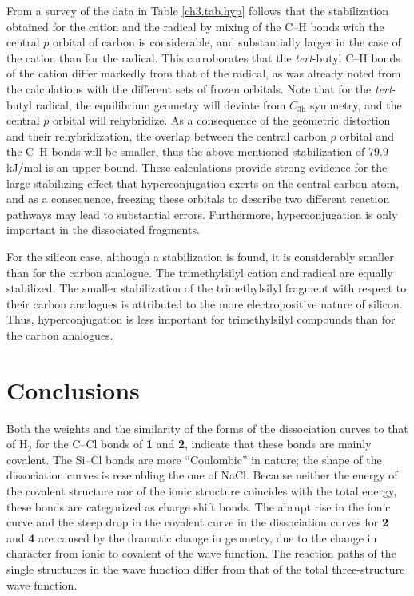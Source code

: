 From a survey of the data in Table \ref{ch3.tab.hyp} follows that the stabilization obtained for the cation and the radical by mixing of the C--H bonds with the central $p$ orbital of carbon is considerable, and substantially larger in the case of the cation than for the radical.  This  corroborates that the \textit{tert}-butyl C--H bonds of the cation differ markedly from that of the radical, as was already noted from the calculations with the different sets of frozen orbitals.  Note that for the \textit{tert}-butyl radical, the equilibrium geometry will deviate from $C_\mathrm{3h}$ symmetry, and the central $p$ orbital will rehybridize.  As a consequence of the geometric distortion and their rehybridization, the overlap between the central carbon $p$ orbital and the C--H bonds will be smaller, thus the above mentioned stabilization of 79.9 kJ/mol is an upper bound.  These calculations provide strong evidence for the large stabilizing effect that hyperconjugation exerts on the central carbon atom, and as a consequence, freezing these orbitals to describe two different reaction pathways may lead to substantial errors.  Furthermore, hyperconjugation is only important in the dissociated fragments.

For the silicon case, although a stabilization is found, it is considerably smaller than for the carbon analogue.  The trimethylsilyl cation and radical are equally stabilized.  The smaller stabilization of the trimethylsilyl fragment with respect to their carbon analogues is attributed to the more electropositive nature of silicon. Thus, hyperconjugation is less important for trimethylsilyl compounds than for the carbon analogues.

\section{Conclusions}

Both the weights and the similarity of the forms of the dissociation curves to that of H$_2$ for the C--Cl bonds of \textbf{1} and \textbf{2}, indicate that these bonds are mainly covalent.  The Si--Cl bonds are more ``Coulombic'' in nature; the shape of the dissociation curves is resembling the one of NaCl. Because neither the energy of the covalent structure nor of the ionic structure coincides with the total energy, these bonds are categorized as charge shift bonds. The abrupt rise in the ionic curve and the steep drop in the covalent curve in the dissociation curves for \textbf{2} and \textbf{4} are caused by the dramatic change in geometry, due to the change in character from ionic to covalent of the wave function. The reaction paths of the single structures in the wave function differ from that of the total three-structure wave function.

